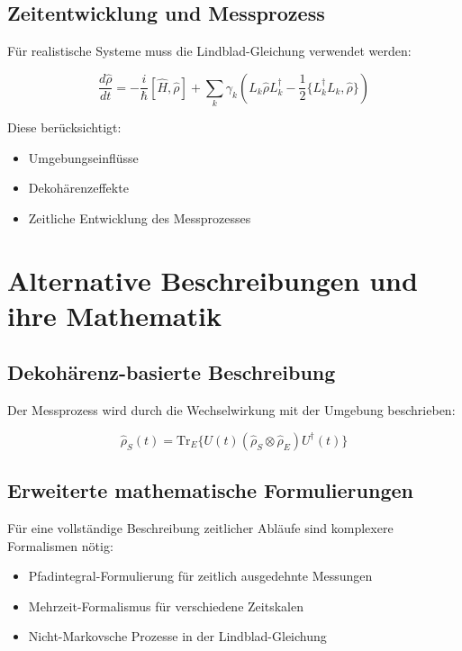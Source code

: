 \documentclass{article}
\begin{document}
	\subsection{Zeitentwicklung und Messprozess}
	Für realistische Systeme muss die Lindblad-Gleichung \cite{lindblad1976} verwendet werden:
	
	\begin{equation}
		\frac{d\hat{\rho}}{dt} = -\frac{i}{\hbar}[\hat{H},\hat{\rho}] + \sum_k \gamma_k\left(L_k\hat{\rho}L_k^\dagger - \frac{1}{2}\{L_k^\dagger L_k,\hat{\rho}\}\right)
	\end{equation}
	
	Diese berücksichtigt:
	\begin{itemize}
		\item Umgebungseinflüsse
		\item Dekohärenzeffekte
		\item Zeitliche Entwicklung des Messprozesses
	\end{itemize}
	
	\section{Alternative Beschreibungen und ihre Mathematik}
	
	\subsection{Dekohärenz-basierte Beschreibung}
	Der Messprozess wird durch die Wechselwirkung mit der Umgebung beschrieben:
	
	\begin{equation}
		\hat{\rho}_S(t) = \text{Tr}_E\{U(t)(\hat{\rho}_S \otimes \hat{\rho}_E)U^\dagger(t)\}
	\end{equation}
	
	\subsection{Erweiterte mathematische Formulierungen}
	Für eine vollständige Beschreibung zeitlicher Abläufe sind komplexere Formalismen nötig:
	
	\begin{itemize}
		\item Pfadintegral-Formulierung für zeitlich ausgedehnte Messungen
		\item Mehrzeit-Formalismus für verschiedene Zeitskalen
		\item Nicht-Markovsche Prozesse in der Lindblad-Gleichung
	\end{itemize}
	
\end{document}
